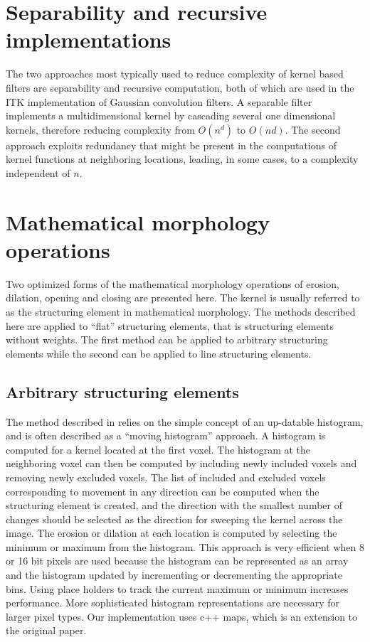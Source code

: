 \documentclass{InsightArticle}
\begin{document}
\section{Separability and recursive implementations}
The two approaches most typically used to reduce complexity of kernel
based filters are separability and recursive computation, both of
which are used in the ITK implementation of Gaussian convolution
filters. A separable filter implements a multidimensional kernel by
cascading several one dimensional kernels, therefore reducing
complexity from $O(n^d)$ to $O(nd)$. The second approach exploits
redundancy that might be present in the computations of kernel
functions at neighboring locations, leading, in some cases, to a complexity
independent of $n$.

\section{Mathematical morphology operations}
Two optimized forms of the mathematical morphology operations of
erosion, dilation, opening and closing are presented here. The kernel
is usually referred to as the structuring element in mathematical
morphology. The methods described here are applied to ``flat''
structuring elements, that is structuring elements without
weights. The first method can be applied to arbitrary structuring
elements while the second can be applied to line structuring elements.

\subsection{Arbitrary structuring elements}
\label{sect:MMmovingHist}
The method described in \cite{Vandroogenbroeck96.3} relies on the
simple concept of an up-datable histogram, and is often described as a
``moving histogram'' approach. A histogram is computed for a kernel
located at the first voxel. The histogram at the neighboring voxel can
then be computed by including newly included voxels and removing newly
excluded voxels. The list of included and excluded voxels
corresponding to movement in any direction can be computed when the
structuring element is created, and the direction with the smallest
number of changes should be selected as the direction for sweeping the
kernel across the image. The erosion or dilation at each location is
computed by selecting the minimum or maximum from the histogram. This
approach is very efficient when 8 or 16 bit pixels are used because
the histogram can be represented as an array and the histogram updated
by incrementing or decrementing the appropriate bins. Using place
holders to track the current maximum or minimum increases
performance. More sophisticated histogram representations are
necessary for larger pixel types. Our implementation uses c++ maps,
which is an extension to the original paper.
\end{document}
